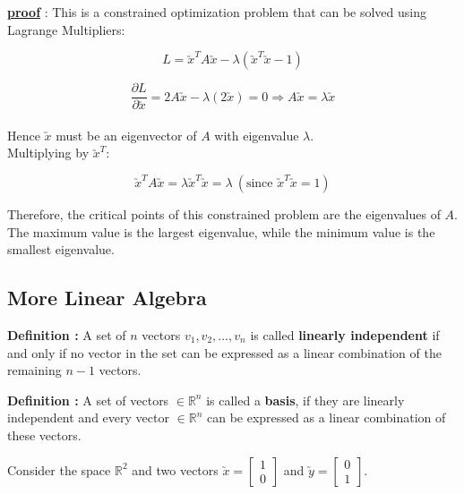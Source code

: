 \documentclass[11pt, a4paper]{article}
\begin{document}
\vspace{0.3cm}

\underline{\textbf{proof}} : This is a constrained optimization problem that can be solved using Lagrange Multipliers:

\[
L = \utilde{x}^T A \utilde{x} - \lambda (\utilde{x}^T \utilde{x} - 1)
\]

\[
\frac{\partial L}{\partial \utilde{x}} = 2 A \utilde{x} - \lambda (2\utilde{x}) = 0 \Rightarrow A \utilde{x} = \lambda \utilde{x}
\]\\[1.5em]

Hence $\utilde{x}$ must be an eigenvector of $A$ with eigenvalue $\lambda$. \\[1.5em]

Multiplying by $\utilde{x}^T$:

\[
\utilde{x}^T A \utilde{x} = \lambda \utilde{x}^T \utilde{x} = \lambda \ (\text{since } \utilde{x}^T \utilde{x} = 1)
\]

Therefore, the critical points of this constrained problem are the eigenvalues of $A$. \\[1.5em]

The maximum value is the largest eigenvalue, while the minimum value is the smallest eigenvalue.

\newpage

\subsection{More Linear Algebra}

\leftpointright \hspace{0.3cm} \textbf{Definition : } A set of $n$ vectors $v_1, v_2, \ldots , v_n$ is called \textbf{linearly independent} 
if and only if no vector in the set can be expressed as a linear combination of the remaining $n - 1$ vectors. \\

\vspace{0.3cm}

\leftpointright \hspace{0.3cm} \textbf{Definition : } A set of vectors $\in \mathbb{R}^n$ is called a \textbf{basis}, if they are linearly independent and every vector $\in \mathbb{R}^n$ can be expressed as a linear combination of these vectors. \\

\vspace{0.3cm}

\leftpointright \hspace{0.3cm} Consider the space $\mathbb{R}^2$ and two vectors $\utilde{x} =  \begin{bmatrix} 1 \\ 0 \end{bmatrix} $ and $\utilde{y} =  \begin{bmatrix} 0 \\ 1 \end{bmatrix} $.
\end{document}
